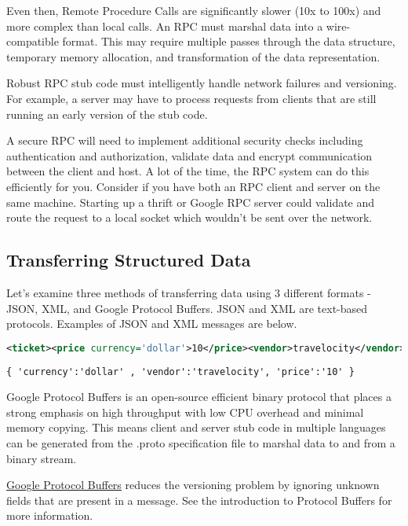 Even then, Remote Procedure Calls are significantly slower (10x to 100x) and more complex than local calls.
An RPC must marshal data into a wire-compatible format.
This may require multiple passes through the data structure, temporary memory allocation, and transformation of the data representation.

Robust RPC stub code must intelligently handle network failures and versioning.
For example, a server may have to process requests from clients that are still running an early version of the stub code.

A secure RPC will need to implement additional security checks including authentication and authorization, validate data and encrypt communication between the client and host.
A lot of the time, the RPC system can do this efficiently for you. Consider if you have both an RPC client and server on the same machine.
Starting up a thrift or Google RPC server could validate and route the request to a local socket which wouldn't be sent over the network.

\subsection{Transferring Structured Data}

Let's examine three methods of transferring data using 3 different formats - JSON, XML, and Google Protocol Buffers.
JSON and XML are text-based protocols.
Examples of JSON and XML messages are below.

\begin{lstlisting}[language=XML]
<ticket><price currency='dollar'>10</price><vendor>travelocity</vendor></ticket>
\end{lstlisting}

\begin{lstlisting}
{ 'currency':'dollar' , 'vendor':'travelocity', 'price':'10' }
\end{lstlisting}

Google Protocol Buffers is an open-source efficient binary protocol that places a strong emphasis on high throughput with low CPU overhead and minimal memory copying.
This means client and server stub code in multiple languages can be generated from the .proto specification file to marshal data to and from a binary stream.

\href{https://developers.google.com/protocol-buffers/docs/overview}{Google Protocol Buffers} reduces the versioning problem by ignoring unknown fields that are present in a message.
See the introduction to Protocol Buffers for more information.

